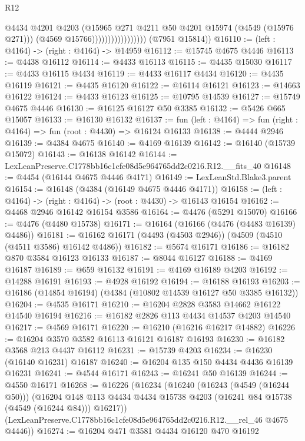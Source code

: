 \begin{lexlean}{R12}
\begin{coremodule}
                                      @4434
                                      @4201
                                      @4203
                                      (@15965 @271 @4211 @50 @4201 @15974 (@4549 (@15976 @271)))
                                      (@4569 @15766)))))))))))))))))
      (@7951 @15814))
@16110 := (left : @4164) -> (right : @4164) -> @14959
@16112 := @15745 @4675 @4446
@16113 := @4438 @16112
@16114 := @4433 @16113
@16115 := @4435 @15030
@16117 := @4433 @16115 @4434
@16119 := @4433 @16117 @4434
@16120 := @4435 @16119
@16121 := @4435 @16120
@16122 := @16114 @16121
@16123 := @14663 @16122
@16124 := @4433 @16123
@16125 := @10795 @14539
@16127 := @15749 @4675 @4446
@16130 := @16125 @16127 @50 @3385
@16132 := @5426 @665 @15057
@16133 := @16130 @16132
@16137 := fun (left : @4164) => fun (right : @4164) => fun (root : @4430) => @16124 @16133
@16138 := @4444 @2946
@16139 := @4384 @4675
@16140 := @4169 @16139
@16142 := @16140 (@15739 @15072)
@16143 := @16138 @16142
@16144 := LexLeanPreserve.C1778bb16c1cfe08d5e964765dd2c0216.R12.__fits_40
@16148 := @4454 (@16144 @4675 @4446 @4171)
@16149 := LexLeanStd.Blake3.parent
@16154 := @16148 (@4384 (@16149 @4675 @4446 @4171))
@16158 := (left : @4164) -> (right : @4164) -> (root : @4430) -> @16143 @16154
@16162 := @4468 @2946 @16142 @16154 @3586
@16164 := @4476 (@5291 @15070)
@16166 := @4476 (@4480 @15738)
@16171 := @16164 (@16166 (@4476 (@4483 @16139) @4486))
@16181 := @16162 @16171 (@4493 (@4503 @2946)) (@4509 (@4510 (@4511 @3586) @16142 @4486))
@16182 := @5674 @16171
@16186 := @16182 @870 @3584 @16123 @16133
@16187 := @8044 @16127
@16188 := @4169 @16187
@16189 := @659 @16132
@16191 := @4169 @16189 @4203
@16192 := @14288 @16191
@16193 := @4928 @16192
@16194 := @16188 @16193
@16203 := @16186 (@14854 @16194) (@4384 (@10802 @14539 @16127 @50 @3385 @16132))
@16204 := @4535 @16171
@16210 := @16204 @2828 @3583 @14662 @16122 @14540 @16194
@16216 := @16182 @2826 @113 @4434 @14537 @4203 @14540
@16217 := @4569 @16171
@16220 := @16210 (@16216 @16217 @14882)
@16226 := @16204 @3570 @3582 @16113 @16121 @16187 @16193
@16230 := @16182 @3568 @213 @4437 @16112
@16231 := @15739 @4203
@16234 := @16230 (@16140 @16231) @16187
@16240 := @16204 @135 @150 @4434 @4436 @16139 @16231
@16241 := @4544 @16171
@16243 := @16241 @50 @16139
@16244 := @4550 @16171
@16268 := @16226
    (@16234
      (@16240
        (@16243 (@4549 (@16244 @50)))
        (@16204 @148 @113 @4434 @4434 @15738 @4203 (@16241 @84 @15738 (@4549 (@16244 @84))) @16217))
      (LexLeanPreserve.C1778bb16c1cfe08d5e964765dd2c0216.R12.__rel_46 @4675 @4446))
@16274 := @16204 @471 @3581 @4434 @16120 @470 @16192

\end{coremodule}
\end{lexlean}
